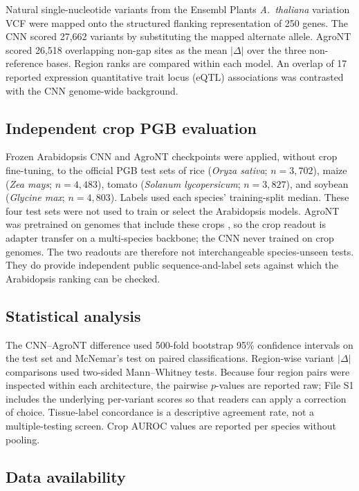 \documentclass[11pt]{article}
\begin{document}
Natural single-nucleotide variants from the Ensembl Plants \emph{A.\ thaliana} variation VCF \citep{harrison2024} were mapped onto the structured flanking representation of 250 genes. The CNN scored 27,662 variants by substituting the mapped alternate allele. AgroNT scored 26,518 overlapping non-gap sites as the mean $|\Delta|$ over the three non-reference bases. Region ranks are compared within each model. An overlap of 17 reported expression quantitative trait locus (eQTL) associations was contrasted with the CNN genome-wide background.

\subsection{Independent crop PGB evaluation}

Frozen Arabidopsis CNN and AgroNT checkpoints were applied, without crop fine-tuning, to the official PGB test sets of rice (\emph{Oryza sativa}; $n=3{,}702$), maize (\emph{Zea mays}; $n=4{,}483$), tomato (\emph{Solanum lycopersicum}; $n=3{,}827$), and soybean (\emph{Glycine max}; $n=4{,}803$). Labels used each species' training-split median. These four test sets were not used to train or select the Arabidopsis models. AgroNT was pretrained on genomes that include these crops \citep{mendoza2024}, so the crop readout is adapter transfer on a multi-species backbone; the CNN never trained on crop genomes. The two readouts are therefore not interchangeable species-unseen tests. They do provide independent public sequence-and-label sets against which the Arabidopsis ranking can be checked.

\subsection{Statistical analysis}

The CNN--AgroNT difference used 500-fold bootstrap 95\% confidence intervals on the test set and McNemar's test on paired classifications. Region-wise variant $|\Delta|$ comparisons used two-sided Mann--Whitney tests. Because four region pairs were inspected within each architecture, the pairwise $p$-values are reported raw; File S1 includes the underlying per-variant scores so that readers can apply a correction of choice. Tissue-label concordance is a descriptive agreement rate, not a multiple-testing screen. Crop AUROC values are reported per species without pooling.

\subsection{Data availability}
\end{document}
